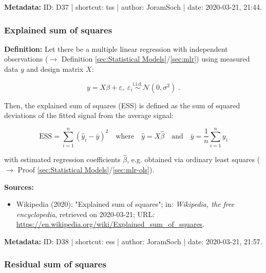 \documentclass[a4paper,12pt,twoside]{book}
\begin{document}
\vspace{1em}
\textbf{Metadata:} ID: D37 | shortcut: tss | author: JoramSoch | date: 2020-03-21, 21:44.
\vspace{1em}



\subsubsection[\textit{Explained sum of squares}]{Explained sum of squares} \label{sec:ess}
\setcounter{equation}{0}

\textbf{Definition:} Let there be a multiple linear regression with independent observations ($\rightarrow$ Definition \ref{sec:Statistical Models}/\ref{sec:mlr}) using measured data $y$ and design matrix $X$:

\begin{equation} \label{eq:ess-mlr}
y = X\beta + \varepsilon, \; \varepsilon_i \overset{\mathrm{i.i.d.}}{\sim} \mathcal{N}(0, \sigma^2) \; .
\end{equation}

Then, the explained sum of squares (ESS) is defined as the sum of squared deviations of the fitted signal from the average signal:

\begin{equation} \label{eq:ess-ess}
\mathrm{ESS} = \sum_{i=1}^n (\hat{y}_i - \bar{y})^2 \quad \text{where} \quad \hat{y} = X \hat{\beta} \quad \text{and} \quad \bar{y} = \frac{1}{n} \sum_{i=1}^n y_i
\end{equation}

with estimated regression coefficients $\hat{\beta}$, e.g. obtained via ordinary least squares ($\rightarrow$ Proof \ref{sec:Statistical Models}/\ref{sec:mlr-ols}).


\vspace{1em}
\textbf{Sources:}
\begin{itemize}
\item Wikipedia (2020): "Explained sum of squares"; in: \textit{Wikipedia, the free encyclopedia}, retrieved on 2020-03-21; URL: \url{https://en.wikipedia.org/wiki/Explained_sum_of_squares}.
\end{itemize}


\vspace{1em}
\textbf{Metadata:} ID: D38 | shortcut: ess | author: JoramSoch | date: 2020-03-21, 21:57.
\vspace{1em}



\subsubsection[\textit{Residual sum of squares}]{Residual sum of squares} \label{sec:rss}
\setcounter{equation}{0}
\end{document}
